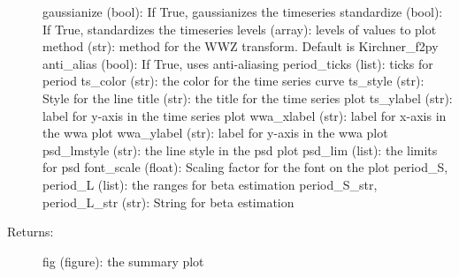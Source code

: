 \documentclass[letterpaper,10pt,english]{sphinxmanual}
\begin{document}
\begin{fulllineitems}
\begin{description}
gaussianize (bool): If True, gaussianizes the timeseries
standardize (bool): If True, standardizes the timeseries
levels (array): levels of values to plot
method (str): method for the WWZ transform. Default is Kirchner\_f2py
anti\_alias (bool): If True, uses anti-aliasing
period\_ticks (list): ticks for period
ts\_color (str): the color for the time series curve
ts\_style (str): Style for the line
title (str): the title for the time series plot
ts\_ylabel (str): label for y-axis in the time series plot
wwa\_xlabel (str): label for x-axis in the wwa plot
wwa\_ylabel (str): label for y-axis in the wwa plot
psd\_lmstyle (str): the line style in the psd plot
psd\_lim (list): the limits for psd
font\_scale (float): Scaling factor for the font on the plot
period\_S, period\_L (list): the ranges for beta estimation
period\_S\_str, period\_L\_str (str): String for beta estimation

\item[{Returns:}] \leavevmode
fig (figure): the summary plot

\end{description}

\end{fulllineitems}

\end{document}
